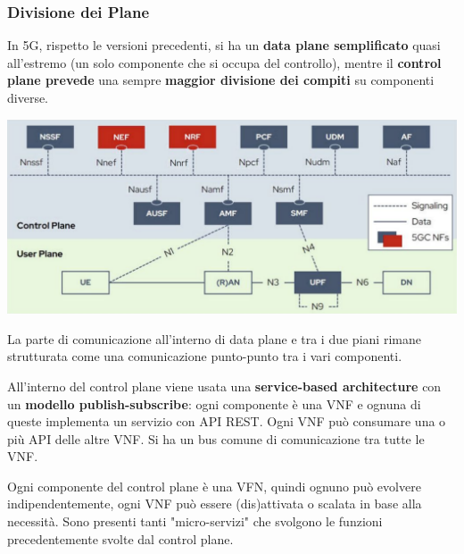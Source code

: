 \subsubsection{Divisione dei Plane}

In 5G, rispetto le versioni precedenti, si ha un \textbf{data plane semplificato} quasi all'estremo (un solo componente che si occupa del controllo), mentre il \textbf{control plane prevede} una sempre \textbf{\textbf{maggior divisione dei compiti}} su componenti diverse.
\begin{center}
	\includegraphics[width=0.98\linewidth]{img/5g/arch}
\end{center}

La parte di comunicazione all'interno di data plane e tra i due piani rimane strutturata come una comunicazione punto-punto tra i vari componenti. 

All'interno del control plane viene usata una \textbf{service-based architecture} con un \textbf{modello publish-subscribe}: ogni componente è una VNF e ognuna di queste implementa un servizio con API REST. Ogni VNF può consumare una o più API delle altre VNF. Si ha un bus comune di comunicazione tra tutte le VNF.

Ogni componente del control plane è una VFN, quindi ognuno può evolvere indipendentemente, ogni VNF può essere (dis)attivata o scalata in base alla necessità. Sono presenti tanti "micro-servizi" che svolgono le funzioni precedentemente svolte dal control plane.

